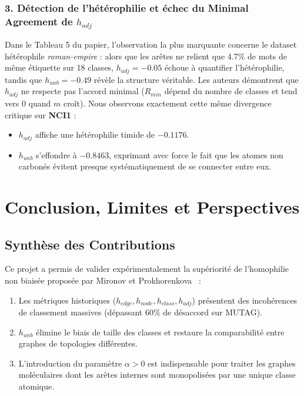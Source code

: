 \documentclass[11pt,a4paper]{article}
\begin{document}
\subsubsection{3. Détection de l'hétérophilie et échec du Minimal Agreement de $h_{adj}$}
Dans le Tableau 5 du papier, l'observation la plus marquante concerne le dataset hétérophile \textit{roman-empire} : alors que les arêtes ne relient que 4.7\% de mots de même étiquette sur 18 classes, $h_{adj} = -0.05$ échoue à quantifier l'hétérophilie, tandis que $h_{unb} = -0.49$ révèle la structure véritable. Les auteurs démontrent que $h_{adj}$ ne respecte pas l'accord minimal ($R_{min}$ dépend du nombre de classes et tend vers 0 quand $m$ croît).
Nous observons exactement cette même divergence critique sur \textbf{NCI1} :
\begin{itemize}[leftmargin=1.5em]
    \item $h_{adj}$ affiche une hétérophilie timide de $-0.1176$.
    \item $h_{unb}$ s'effondre à \textbf{$-0.8463$}, exprimant avec force le fait que les atomes non carbonés évitent presque systématiquement de se connecter entre eux.
\end{itemize}

\section{Conclusion, Limites et Perspectives}

\subsection{Synthèse des Contributions}

Ce projet a permis de valider expérimentalement la supériorité de l'homophilie non biaisée proposée par Mironov et Prokhorenkova~\cite{mironov2024revisiting} :
\begin{enumerate}[leftmargin=1.5em]
    \item Les métriques historiques ($h_{edge}, h_{node}, h_{class}, h_{adj}$) présentent des incohérences de classement massives (dépassant 60\% de désaccord sur MUTAG).
    \item $h_{unb}$ élimine le biais de taille des classes et restaure la comparabilité entre graphes de topologies différentes.
    \item L'introduction du paramètre $\alpha > 0$ est indispensable pour traiter les graphes moléculaires dont les arêtes internes sont monopolisées par une unique classe atomique.
\end{enumerate}
\end{document}
